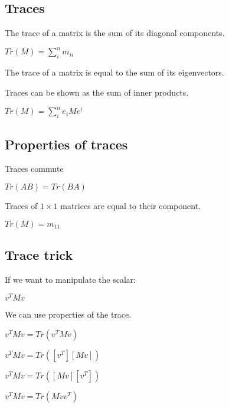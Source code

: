 
\subsection{Traces}

The trace of a matrix is the sum of its diagonal components.

\(Tr(M)=\sum_i^nm_{ii}\)

The trace of a matrix is equal to the sum of its eigenvectors.

Traces can be shown as the sum of inner products.

\(Tr(M)=\sum_i^ne_iMe^i\)


\subsection{Properties of traces}

Traces commute

\(Tr(AB)=Tr(BA)\)

Traces of \(1\times 1\) matrices are equal to their component.

\(Tr(M)=m_{11}\)

\subsection{Trace trick}

If we want to manipulate the scalar:

\(v^TMv\)

We can use properties of the trace.

\(v^TMv=Tr(v^TMv)\)

\(v^TMv=Tr([v^T][Mv])\)

\(v^TMv=Tr([Mv][v^T])\)

\(v^TMv=Tr(Mvv^T)\)

